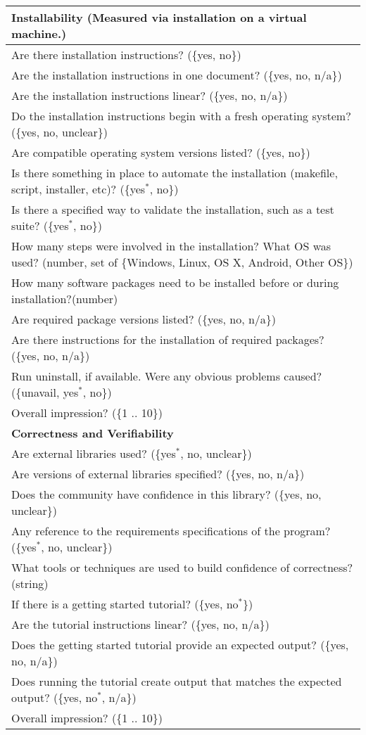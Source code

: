 \begin{longtable}{p{16cm}}
  \midrule
  \textbf{Installability} (Measured via installation on a virtual machine.)\\
  \midrule
  Are there installation instructions? (\{yes, no\})\\
  Are the installation instructions in one document? (\{yes, no, n/a\})\\
  Are the installation instructions linear? (\{yes, no, n/a\})\\
  Do the installation instructions begin with a fresh operating system? (\{yes, no, unclear\})\\
  Are compatible operating system versions listed? (\{yes, no\})\\
  Is there something in place to automate the installation (makefile, script,
  installer, etc)? (\{yes$^*$, no\})\\
  Is there a specified way to validate the installation, such as a test suite? (\{yes$^*$, no\})\\
  How many steps were involved in the installation? What OS was used? (number, set of \{Windows, Linux, OS X, Android, Other OS\}) \\
  How many software packages need to be installed before or during installation?(number) \\
  Are required package versions listed? (\{yes, no, n/a\})\\
  Are there instructions for the installation of required packages? (\{yes, no, n/a\})\\
  Run uninstall, if available. Were any obvious problems caused? (\{unavail, yes$^*$, no\})\\
  Overall impression? (\{1 .. 10\})\\

  \midrule
  \textbf{Correctness and Verifiability}\\
  \midrule

  Are external libraries used? (\{yes$^*$, no, unclear\})\\
  Are versions of external libraries specified? (\{yes, no, n/a\})\\
  Does the community have confidence in this library? (\{yes, no, unclear\})\\
  Any reference to the requirements specifications of the program? (\{yes$^*$, no, unclear\})\\
  What tools or techniques are used to build confidence of correctness? (string)\\
  If there is a getting started tutorial? (\{yes, no$^*$\})\\
  Are the tutorial instructions linear? (\{yes, no, n/a\})\\
  Does the getting started tutorial provide an expected output? (\{yes, no, n/a\})\\
  Does running the tutorial create output that matches the expected output? (\{yes, no$^*$, n/a\})\\
  Overall impression? (\{1 .. 10\})\\


\end{longtable}

